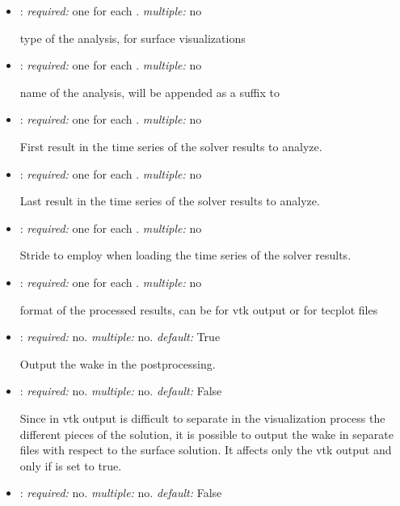 \begin{itemize}
\item {}: \textit{required:} one for each . \textit{multiple:} no

type of the analysis,  for surface visualizations

\item {}: \textit{required:} one for each . \textit{multiple:} no

name of the analysis, will be appended as a suffix to 

\item {}: \textit{required:} one for each . \textit{multiple:} no

First result in the time series of the solver results to analyze.

\item {}: \textit{required:} one for each . \textit{multiple:} no

Last result in the time series of the solver results to analyze.

\item {}: \textit{required:} one for each . \textit{multiple:} no

Stride to employ when loading the time series of the solver results. 

\item {}: \textit{required:} one for each . \textit{multiple:} no

format of the processed results, can be  for vtk output or  
for tecplot  files

\item {}: \textit{required:} no. \textit{multiple:} no. \textit{default:} True

Output the wake in the postprocessing.

\item {}: \textit{required:} no. \textit{multiple:} no. 
\textit{default:} False

Since in vtk output is difficult to separate in the visualization process the 
different pieces of the solution, it is possible to output the wake in separate 
files with respect to the surface solution. It affects only the vtk output and 
only if  is set to true.

\item {}: \textit{required:} no. \textit{multiple:} no. \textit{default:} False


\end{itemize}
